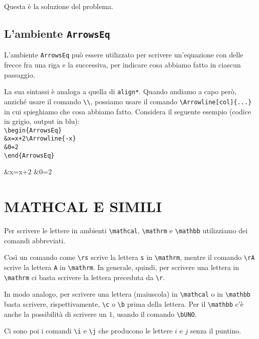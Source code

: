 \documentclass[italian, a4paper]{article}
\newcommand{\bs}{\textbackslash}
\newcommand{\ttt}[1]{\texttt{#1}}
\begin{document}
\begin{Sol}
Questa è la soluzione del problema.
\end{Sol}
\color{black}

\subsection{L'ambiente \ttt{ArrowsEq}}
L'ambiente \ttt{ArrowsEq} può essere utilizzato per scrivere un'equazione con delle frecce fra una riga e la successiva, per indicare cosa abbiamo fatto in ciascun passaggio.

La sua sintassi è analoga a quella di \ttt{align*}. Quando andiamo a capo però, anziché usare il comando \ttt{\bs\bs}, possiamo usare il comando \ttt{\bs Arrowline[col]\{...\}} in cui spieghiamo che cosa abbiamo fatto. Considera il seguente esempio (codice in grigio, output in blu):\color{gray}\\
\ttt{\bs begin\{ArrowsEq\}}\\
\hspace*{5mm}\ttt{\&x=x+2\bs Arrowline\{-x\}}\\
\hspace*{5mm}\ttt{\&0=2}\\
\ttt{\bs end\{ArrowsEq\}}\\

\color{blue}
\begin{ArrowsEq}
&x=x+2
&0=2
\end{ArrowsEq}
\color{black}

\section{MATHCAL E SIMILI}
Per scrivere le lettere in ambienti \ttt{\bs mathcal}, \ttt{\bs mathrm} e \ttt{\bs mathbb} utilizziamo dei comandi abbreviati.

Così un comando come \ttt{\bs rs} scrive la lettera \ttt{s} in \ttt{\bs mathrm}, mentre il comando \ttt{\bs rA} scrive la lettera \ttt{A} in \ttt{\bs mathrm}. In generale, quindi, per scrivere una lettera in \ttt{\bs mathrm} ci basta scrivere la lettera preceduta da \ttt{\bs r}.

In modo analogo, per scrivere una lettera (maiuscola) in \ttt{\bs mathcal} o in \ttt{\bs mathbb} basta scrivere, rispettivamente, \ttt{\bs c} o \ttt{\bs b} prima della lettera. Per il \ttt{\bs mathbb} c'è anche la possibilità di scrivere un $1$, usando il comando \ttt{\bs bUNO}.

Ci sono poi i comandi \ttt{\bs i} e \ttt{\bs j} che producono le lettere $i$ e $j$ senza il puntino.
\end{document}

